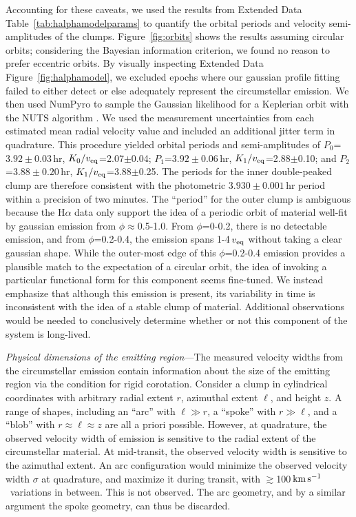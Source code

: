 \documentclass{nature3}
\newcommand{\kms}{\ensuremath{\rm km\,s^{-1}}}
\begin{document}
\begin{methods}
Accounting for these caveats, we used the results from Extended Data
Table~\ref{tab:halphamodelparams} to quantify the orbital periods and
velocity semi-amplitudes of the clumps.
Figure~\ref{fig:orbits} shows the results assuming circular
orbits; considering the Bayesian information criterion, we found no
reason to prefer eccentric orbits.  By visually
inspecting Extended Data Figure~\ref{fig:halphamodel}, we excluded
epochs where our gaussian profile fitting failed to either detect or
else adequately represent the circumstellar emission.  We then used
NumPyro to sample the Gaussian likelihood for a Keplerian orbit
with the NUTS algorithm \cite{Phan2019}.  We used the measurement
uncertainties from each estimated mean radial velocity value and
included an additional jitter term in quadrature.  This procedure
yielded orbital periods and semi-amplitudes of
$P_0$=$3.92\pm0.03$\,hr, $K_0/v_{\rm eq}$=2.07$\pm$0.04;
$P_1$=$3.92\pm0.06$\,hr, $K_1/v_{\rm eq}$=2.88$\pm$0.10;
and $P_2$=$3.88\pm0.20$\,hr, $K_1/v_{\rm eq}$=3.88$\pm$0.25.
The periods for the inner double-peaked clump are therefore consistent with the
photometric $3.930\pm0.001$\,hr period within a precision of two
minutes.  The ``period'' for the outer clump is ambiguous because the
H$\alpha$ data only support the idea of a periodic orbit of material
well-fit by gaussian emission from $\phi$$\approx$0.5-1.0.  From
$\phi$=0-0.2, there is no detectable emission, and from
$\phi$=0.2-0.4, the emission spans 1-4\,$v_{\rm eq}$ without taking a
clear gaussian shape.  While the outer-most edge of this
$\phi$=0.2-0.4 emission provides a plausible match to the expectation
of a circular orbit, the idea of invoking a particular functional form
for this component seems fine-tuned.  We instead emphasize that
although this emission is present, its variability in time is 
inconsistent with the idea of a stable clump of material.
Additional observations would be needed to conclusively
determine whether or not this component of the system is long-lived.


{\it Physical dimensions of the emitting region}---The measured velocity
widths from the circumstellar emission contain information about the
size of the emitting region via the condition for rigid corotation.
Consider a clump in cylindrical coordinates with arbitrary radial extent
$r$, azimuthal extent $\ell$, and height $z$.  A range of shapes,
including an ``arc'' with $\ell \gg r$, a ``spoke'' with $r \gg \ell$, and
a ``blob'' with $r \approx \ell \approx z$ are all a priori possible.
However, at quadrature, the observed velocity width of emission is
sensitive to the radial extent of the circumstellar material.  At
mid-transit, the observed velocity width is sensitive to the azimuthal
extent.  An arc configuration would minimize the observed velocity width
$\sigma$ at quadrature, and maximize it during transit, with
$\gtrsim$100\,\kms\ variations in between.  This is not observed.   The
arc geometry, and by a similar argument the spoke geometry, can thus be
discarded.  


\end{methods}
\end{document}

